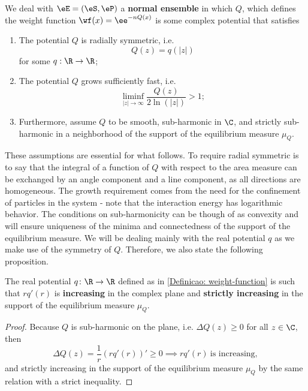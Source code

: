 \begin{definicao}
	\label{Definicao: weight-function}
	We deal with $\eE = (\eS, \eP)$ a \textbf{normal ensemble} in which $Q$, which defines the weight function $\wf(x) = \ee^{-nQ(x)}$ is some complex potential that satisfies
	\begin{enumerate}
		\item The potential $Q$ is radially symmetric, i.e.
		\begin{equation}
			Q(z) = q(|z|)
		\end{equation}
		for some $q: \R \rightarrow \R$;
		\item The potential $Q$ grows sufficiently fast, i.e. 
		\begin{equation}
			\liminf_{|z| \rightarrow \infty} \frac{Q(z)}{2 \ln(|z|)} > 1;
		\end{equation}
		\item Furthermore, assume $Q$ to be smooth, sub-harmonic in $\C$, and strictly sub-harmonic in a neighborhood of the support of the equilibrium measure $\mu_Q$.
	\end{enumerate}
\end{definicao}

These assumptions are essential for what follows. To require radial symmetric is to say that the integral of a function of $Q$ with respect to the area measure can be exchanged by an angle component and a line component, as all directions are homogeneous. The growth requirement comes from the need for the confinement of particles in the system - note that the interaction energy has logarithmic behavior. The conditions on sub-harmonicity can be though of as convexity and will ensure uniqueness of the minima and connectedness of the support of the equilibrium measure. We will be dealing mainly with the real potential $q$ as we make use of the symmetry of $Q$. Therefore, we also state the following proposition.

\begin{proposicao}
	The real potential $q \colon \R \rightarrow \R$ defined as in \autoref{Definicao: weight-function} is such that $rq'(r)$ is \textbf{increasing} in the complex plane and \textbf{strictly increasing} in the support of the equilibrium measure $\mu_Q$.
\end{proposicao}
\begin{proof}
	Because $Q$ is sub-harmonic on the plane, i.e. $\Delta Q(z) \geq 0$ for all $z \in \C$, then
	\begin{equation}
		\Delta Q(z) = \frac{1}{r} (r q'(r))' \geq 0 \implies rq'(r) \ \text{is increasing},
	\end{equation}
	and strictly increasing in the support of the equilibrium measure $\mu_Q$ by the same relation with a strict inequality. 
\end{proof}

